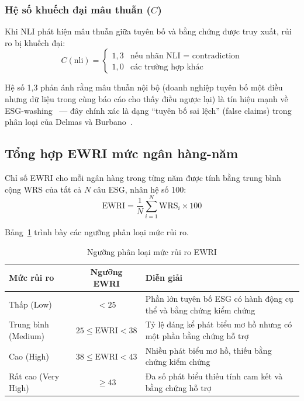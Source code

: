 \subsubsection{Hệ số khuếch đại mâu thuẫn ($C$)}

Khi NLI phát hiện mâu thuẫn giữa tuyên bố và bằng chứng được truy xuất, rủi ro bị khuếch đại:
\begin{equation}
    C(\text{nli}) = \begin{cases}
        1{,}3 & \text{nếu nhãn NLI = contradiction} \\
        1{,}0 & \text{các trường hợp khác}
    \end{cases}
    \label{eq:contradiction_amplifier}
\end{equation}

Hệ số 1{,}3 phản ánh rằng mâu thuẫn nội bộ (doanh nghiệp tuyên bố một điều nhưng dữ liệu trong cùng báo cáo cho thấy điều ngược lại) là tín hiệu mạnh về ESG-washing~\cite{lyon2015means} --- đây chính xác là dạng ``tuyên bố sai lệch'' (false claims) trong phân loại của Delmas và Burbano~\cite{delmas2011drivers}.


\subsection{Tổng hợp EWRI mức ngân hàng-năm}
\label{subsec:ewri_aggregation}

Chỉ số EWRI cho mỗi ngân hàng trong từng năm được tính bằng trung bình cộng WRS của tất cả $N$ câu ESG, nhân hệ số 100:
\begin{equation}
    \text{EWRI} = \frac{1}{N} \sum_{i=1}^{N} \text{WRS}_i \times 100
    \label{eq:ewri}
\end{equation}

Bảng~\ref{tab:risk_thresholds} trình bày các ngưỡng phân loại mức rủi ro.

\begin{table}[htbp]
\centering
\caption{Ngưỡng phân loại mức rủi ro EWRI}
\label{tab:risk_thresholds}
\small
\renewcommand{\arraystretch}{1.3}
\begin{tabular}{|l|c|p{7cm}|}
\hline
\textbf{Mức rủi ro} & \textbf{Ngưỡng EWRI} & \textbf{Diễn giải} \\
\hline
Thấp (Low) & $< 25$ & Phần lớn tuyên bố ESG có hành động cụ thể và bằng chứng kiểm chứng \\
\hline
Trung bình (Medium) & $25 \leq \text{EWRI} < 38$ & Tỷ lệ đáng kể phát biểu mơ hồ nhưng có một phần bằng chứng hỗ trợ \\
\hline
Cao (High) & $38 \leq \text{EWRI} < 43$ & Nhiều phát biểu mơ hồ, thiếu bằng chứng kiểm chứng \\
\hline
Rất cao (Very High) & $\geq 43$ & Đa số phát biểu thiếu tính cam kết và bằng chứng hỗ trợ \\
\hline
\end{tabular}
\end{table}

